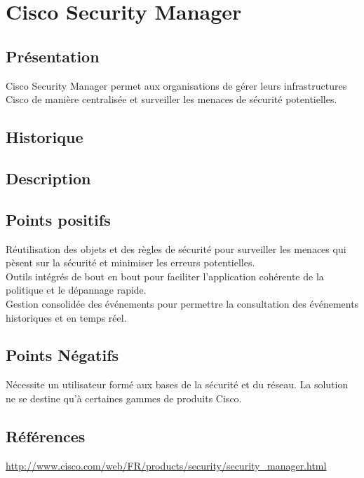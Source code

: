\section{Cisco Security Manager}
\thispagestyle{plain}
\subsection{Présentation}
Cisco Security Manager permet aux organisations de gérer leurs infrastructures Cisco de manière centralisée et surveiller les menaces de sécurité potentielles.

\subsection{Historique}

\subsection{Description}

\subsection{Points positifs}
Réutilisation des objets et des règles de sécurité pour surveiller les menaces qui pèsent sur la sécurité et minimiser les erreurs potentielles.\\
Outils intégrés de bout en bout pour faciliter l'application cohérente de la politique et le dépannage rapide.\\
Gestion consolidée des événements pour permettre la consultation des événements historiques et en temps réel.\\

\subsection{Points Négatifs}
Nécessite un utilisateur formé aux bases de la sécurité et du réseau.
La solution ne se destine qu’à certaines gammes de produits Cisco.

\subsection{Références}
\small
\noindent
\url{http://www.cisco.com/web/FR/products/security/security_manager.html}
\normalsize
